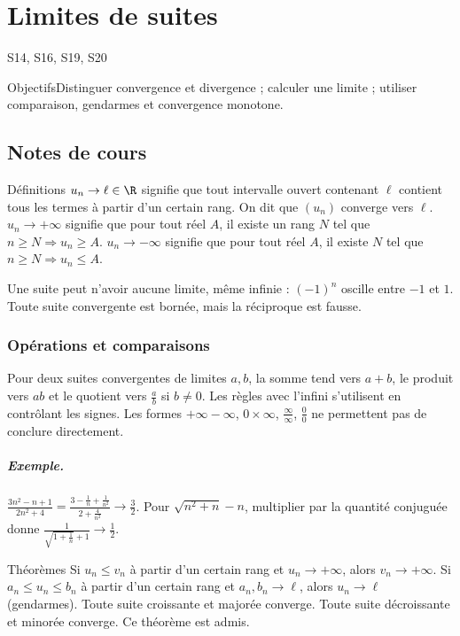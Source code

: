 \setcounter{chapter}{1}\chapter{Limites de suites}\label{ch:2}

{\small\sffamily\color{teal}S14, S16, S19, S20\par}

\begin{retenir}{Objectifs}Distinguer convergence et divergence ; calculer une limite ; utiliser comparaison, gendarmes et convergence monotone.\end{retenir}

\section{Notes de cours}
\begin{retenir}{Définitions}
$u_n\to\ell\in\R$ signifie que tout intervalle ouvert contenant $\ell$ contient tous les termes à partir d'un certain rang. On dit que $(u_n)$ converge vers $\ell$.
$u_n\to+\infty$ signifie que pour tout réel $A$, il existe un rang $N$ tel que $n\ge N\Rightarrow u_n\ge A$. $u_n\to-\infty$ signifie que pour tout réel $A$, il existe $N$ tel que $n\ge N\Rightarrow u_n\le A$.
\end{retenir}
Une suite peut n'avoir aucune limite, même infinie : $(-1)^n$ oscille entre $-1$ et $1$. Toute suite convergente est bornée, mais la réciproque est fausse.
\subsection{Opérations et comparaisons}
Pour deux suites convergentes de limites $a,b$, la somme tend vers $a+b$, le produit vers $ab$ et le quotient vers $\frac{a}{b}$ si $b\ne0$. Les règles avec l'infini s'utilisent en contrôlant les signes. Les formes $+\infty-\infty$, $0\times\infty$, $\frac{\infty}{\infty}$, $\frac{0}{0}$ ne permettent pas de conclure directement.
\paragraph{Exemple.} $\frac{3n^2-n+1}{2n^2+4}=\frac{3-\frac{1}{n}+\frac{1}{n^2}}{2+\frac{4}{n^2}}\to\frac{3}{2}$. Pour $\sqrt{n^2+n}-n$, multiplier par la quantité conjuguée donne $\frac{1}{\sqrt{1+\frac{1}{n}}+1}\to\frac{1}{2}$.
\begin{retenir}{Théorèmes}
Si $u_n\le v_n$ à partir d'un certain rang et $u_n\to+\infty$, alors $v_n\to+\infty$. Si $a_n\le u_n\le b_n$ à partir d'un certain rang et $a_n,b_n\to\ell$, alors $u_n\to\ell$ (gendarmes).
Toute suite croissante et majorée converge. Toute suite décroissante et minorée converge. Ce théorème est admis.
\end{retenir}
